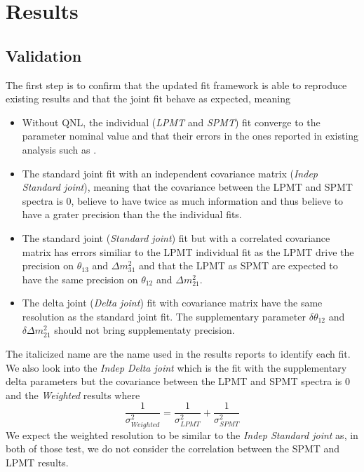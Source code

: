 \documentclass[../main.tex]{subfiles}
\begin{document}
\section{Results}
\label{sec:joint_fit:results}
%
%
%

\subsection{Validation}
\label{sec:joint_fit:validation}

The first step is to confirm that the updated fit framework is able to reproduce existing results and that the joint fit behave as expected, meaning
\begin{itemize}
  \item Without QNL, the individual (\textit{LPMT} and \textit{SPMT}) fit converge to the parameter nominal value and that their errors in the ones reported in existing analysis such as \cite{juno_collaboration_sub-percent_2022}.
  \item The standard joint fit with an independent covariance matrix (\textit{Indep Standard joint}), meaning that the covariance between the LPMT and SPMT spectra is 0, believe to have twice as much information and thus believe to have a grater precision than the the individual fits.
  \item The standard joint (\textit{Standard joint}) fit but with a correlated covariance matrix has errors similiar to the LPMT individual fit as the LPMT drive the precision on $\theta_{13}$ and $\Delta m^2_{31}$ and that the LPMT as SPMT are expected to have the same precision on $\theta_{12}$ and $\Delta m^2_{21}$.
  \item The delta joint (\textit{Delta joint}) fit with covariance matrix have the same resolution as the standard joint fit. The supplementary parameter $\delta \theta_{12}$ and $\delta \Delta m^2_{21}$ should not bring supplementaty precision.
\end{itemize}

The italicized name are the name used in the results reports to identify each fit. We also look into the \textit{Indep Delta joint} which is the fit with the supplementary delta parameters but the covariance between the LPMT and SPMT spectra is 0 and the \textit{Weighted} results where
\begin{equation}
  \frac{1}{\sigma^2_{Weighted}} = \frac{1}{\sigma^2_{LPMT}} + \frac{1}{\sigma^2_{SPMT}}
\end{equation}
We expect the weighted resolution to be similar to the \textit{Indep Standard joint} as, in both of those test, we do not consider the correlation between the SPMT and LPMT results.
\end{document}
